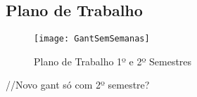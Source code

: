\subsection{Plano de Trabalho}

\begin{figure}[t]
  \begin{center}
    \leavevmode
    \texttt{[image: GantSemSemanas]}
    \caption{Plano de Trabalho 1º e 2º Semestres}	
    \label{fig:planotrabalho}
  \end{center}
\end{figure}

//Novo gant só com 2º semestre?

